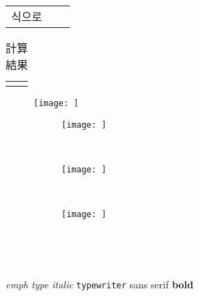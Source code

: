 
\begin{longtable}[l or c or r]{l r l}  식으로
\end{longtable}

\begin{table}
	\centering
	\caption{計算結果}
	\label{tab:rst2}
	\begin{tabular}{l l}
		\toprule
		 & \\
		\midrule
		 & \\
		\bottomrule
	\end{tabular}
\end{table}

\begin{figure} %
	\centering
	\texttt{[image: ]}
	\caption{}
	\label{}
\end{figure}

\begin{figure}
	\centering
	\begin{subfigure}[b]{0.3\textwidth}
		\texttt{[image: ]}
		\caption{}
		\label{fig:}
	\end{subfigure}
	~ %
	\begin{subfigure}[b]{0.3\textwidth}
		\texttt{[image: ]}
		\caption{}
		\label{fig:}
	\end{subfigure}
	~ %
	\begin{subfigure}[b]{0.3\textwidth}
		\texttt{[image: ]}
		\caption{}
		\label{fig:}
	\end{subfigure}
	\caption{}\label{fig:}
\end{figure}

\paragraph{}　\\
\subparagraph{}　\\

\underline{}
\emph{emph}
\textit{type italic} %
\texttt{typewriter} %
\textsf{sans serif} %
\textbf{bold}
